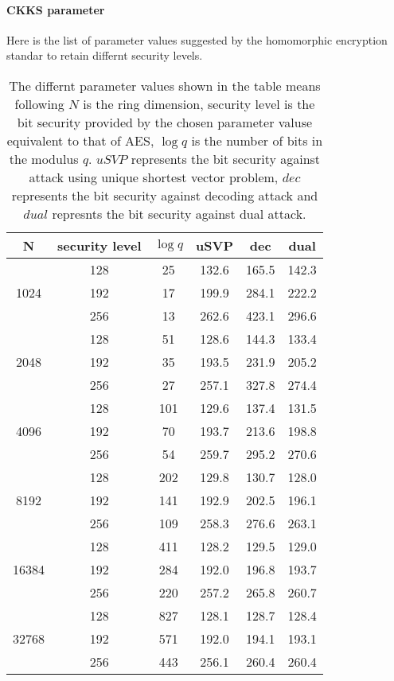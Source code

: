 \documentclass[a4paper,10pt]{article}
\begin{document}
\newpage
\paragraph{CKKS parameter} Here is the list of parameter values suggested by the homomorphic encryption standar to retain differnt security levels.




\begin{center}
\begin{table}[h]
\begin{tabular}{|c|c|c|c|c|c|}
\hline
N  &  security level & $\log q$ &  uSVP & dec & dual  \\
\hline
\multirow{3}{4em}{1024} & 128 & 25 & 132.6 & 165.5 & 142.3 \\
& 192 & 17 & 199.9 & 284.1 & 222.2 \\
& 256 & 13 & 262.6 & 423.1 & 296.6 \\
\hline
\multirow{3}{4em}{2048} & 128 & 51 & 128.6 & 144.3 & 133.4 	\\
& 192 & 35 & 193.5 & 231.9 & 205.2 \\
& 256 & 27 & 257.1 & 327.8 & 274.4 \\
\hline
\multirow{3}{4em}{4096} & 128 & 101 & 129.6 & 137.4 & 131.5  \\
& 192 & 70 & 193.7 & 213.6 & 198.8 \\
& 256 & 54 & 259.7 & 295.2 & 270.6 \\
\hline
\multirow{3}{4em}{8192} & 128 & 202 & 129.8 & 130.7 & 128.0\\
& 192 & 141 & 192.9 & 202.5 & 196.1\\
& 256 & 109 & 258.3 & 276.6 & 263.1\\
\hline
\multirow{3}{4em}{16384} & 128 & 411 & 128.2 & 129.5 & 129.0\\
& 192 & 284 & 192.0 & 196.8 & 193.7\\
& 256 & 220 & 257.2 & 265.8 & 260.7\\
\hline
\multirow{3}{4em}{32768} & 128 & 827 & 128.1 & 128.7 & 128.4\\
& 192 & 571 & 192.0 & 194.1 & 193.1\\
& 256 & 443 & 256.1 & 260.4 & 260.4\\
\hline

\end{tabular}
\caption{The differnt parameter values shown in the table means following $N$ is the ring dimension, security level is the bit security provided by the chosen parameter valuse equivalent to that of AES, $\log q$ is the number of bits in the modulus $q$. $uSVP$ represents the bit security against attack using unique shortest vector problem, $dec$ represents the bit security against decoding attack and $dual$ represnts the bit security against dual attack.}
\end{table}
\end{center}
\end{document}
